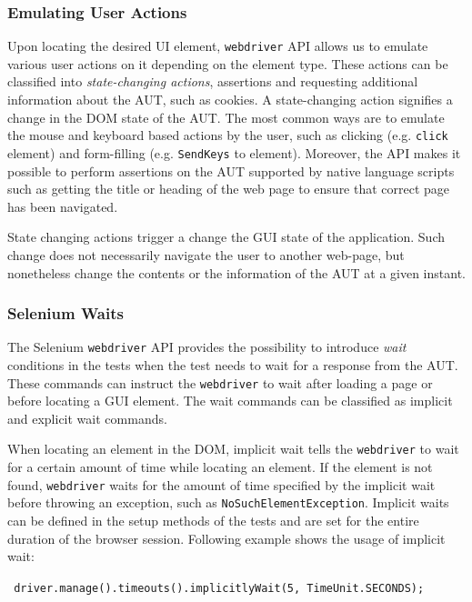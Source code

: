 \subsubsection{Emulating User Actions}
\label{sssec:emulatingActions}
Upon locating the desired UI element, \texttt{webdriver} API allows us to emulate various user actions on it depending on the element type. These actions can be classified into \textit{state-changing actions}, assertions and requesting additional information about the AUT, such as cookies. A state-changing action signifies a change in the DOM state of the AUT. The most common ways are to emulate the mouse and keyboard based actions by the user, such as clicking (e.g. \texttt{click} element) and form-filling (e.g. \texttt{SendKeys} to element). Moreover, the API makes it possible to perform assertions on the AUT supported by native language scripts such as getting the title or heading of the web page to ensure that correct page has been navigated. 

State changing actions trigger a change the GUI state of the application. Such change does not necessarily navigate the user to another web-page, but nonetheless change the contents or the information of the AUT at a given instant.

\subsubsection{Selenium Waits}
\label{sssec:seleniumwaits}
The Selenium \texttt{webdriver} API provides the possibility to introduce \textit{wait} conditions in the tests when the test needs to wait for a response from the AUT. These commands can instruct the \texttt{webdriver} to wait after loading a page or before locating a GUI element. The wait commands can be classified as implicit and explicit wait commands. 

When locating an element in the DOM, implicit wait tells the \texttt{webdriver} to wait for a certain amount of time while locating an element. If the element is not found, \texttt{webdriver} waits for the amount of time specified by the implicit wait before throwing an exception, such as \texttt{NoSuchElementException}. Implicit waits can be defined in the setup methods of the tests and are set for the entire duration of the browser session. Following example shows the usage of implicit wait:
\begin{footnotesize}
\texttt{ driver.manage().timeouts().implicitlyWait(5, TimeUnit.SECONDS); 
}
\end{footnotesize}

